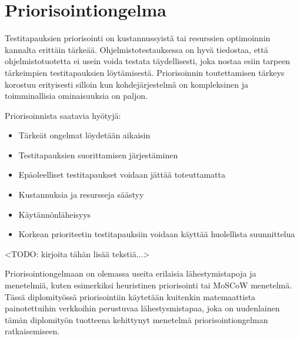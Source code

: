 \section{Priorisointiongelma} \label{ch:08_priorisointiongelma}

  Testitapauksien priorisointi on kustannussyistä tai resurssien optimoinnin kannalta erittäin tärkeää.
  Ohjelmistotestauksessa on hyvä tiedostaa, että ohjelmistotuotetta ei usein voida testata täydellisesti, joka nostaa esiin tarpeen tärkeimpien testitapauksien löytämisestä.
  Priorisoinnin toutettamisen tärkeys korostuu erityisesti silloin kun kohdejärjestelmä on kompleksinen ja toimminallisia ominaisuuksia on paljon.

  Priorisoinnista saatavia hyötyjä:
  \begin{itemize}
    \item Tärkeät ongelmat löydetään aikaisin
    \item Testitapauksien suorittamisen järjestäminen
    \item Epäoleelliset testitapaukset voidaan jättää toteuttamatta
    \item Kustannuksia ja resursseja säästyy
    \item Käytännönläheisyys
    \item Korkean prioriteetin testitapauksiin voidaan käyttää huolellista suunnittelua
  \end{itemize}

  <TODO: kirjoita tähän lisää tekstiä...>

  Priorisointiongelmaan on olemassa useita erilaisia lähestymistapoja ja menetelmiä, kuten esimerkiksi heuristinen priorisointi tai MoSCoW menetelmä.
  Tässä diplomityössä priorisointiin käytetään kuitenkin matemaattista painotettuihin verkkoihin perustuvaa lähestysmistapaa, joka on uudenlainen tämän diplomityön tuotteena kehittynyt menetelmä priorisointiongelman ratkaisemiseen.
